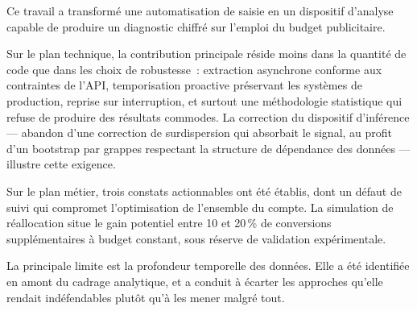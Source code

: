 \documentclass[11pt,a4paper]{article}
\begin{document}
Ce travail a transformé une automatisation de saisie en un dispositif d'analyse
capable de produire un diagnostic chiffré sur l'emploi du budget publicitaire.

Sur le plan technique, la contribution principale réside moins dans la quantité
de code que dans les choix de robustesse~: extraction asynchrone conforme aux
contraintes de l'API, temporisation proactive préservant les systèmes de
production, reprise sur interruption, et surtout une méthodologie statistique
qui refuse de produire des résultats commodes. La correction du dispositif
d'inférence --- abandon d'une correction de surdispersion qui absorbait le
signal, au profit d'un bootstrap par grappes respectant la structure de
dépendance des données --- illustre cette exigence.

Sur le plan métier, trois constats actionnables ont été établis, dont un défaut
de suivi qui compromet l'optimisation de l'ensemble du compte. La simulation de
réallocation situe le gain potentiel entre 10 et 20\,\% de conversions
supplémentaires à budget constant, sous réserve de validation expérimentale.

La principale limite est la profondeur temporelle des données. Elle a été
identifiée en amont du cadrage analytique, et a conduit à écarter les
approches qu'elle rendait indéfendables plutôt qu'à les mener malgré tout.
\end{document}
